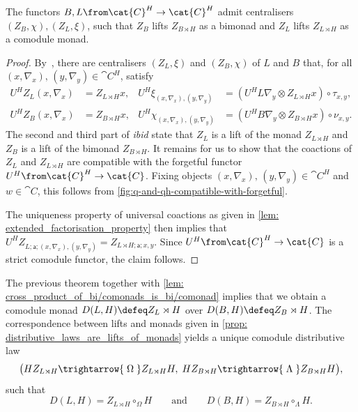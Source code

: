 \begin{theorem}\label{thm: centralisablity_of_lifts}
  The functors \(B, L\from \cat{C}^H\to \cat{C}^H\) admit centralisers \((Z_B, \chi), (Z_L, \xi)\),
  such that \(Z_B\) lifts \(Z_{B \rtimes H}\) as a bimonad
  and \(Z_L\) lifts \(Z_{L \rtimes H}\) as a comodule monad.
\end{theorem}
\begin{proof}
  By~\cite[Theorem~7.4(a)]{Bruguieres2012},
  there are centralisers \((Z_L, \xi)\) and \((Z_B, \chi)\) of \(L\) and \(B\)
  that, for all \((x, \nabla_x),\, (y, \nabla_y) \in \cat{C}^H\), satisfy
  \begin{align*}
    U^H Z_L (x, \nabla_x) &= Z_{L \rtimes H}x, & U^H\xi_{(x, \nabla_x), (y, \nabla_y)} &= (U^H L\nabla_y \otimes Z_{L \rtimes H}x) \circ \tau_{x,y}, \\
    U^H Z_B (x, \nabla_x) &= Z_{B \rtimes H}x, & U^H\chi_{(x, \nabla_x), (y, \nabla_y)} &= (U^H B\nabla_y \otimes Z_{B \rtimes H}x) \circ \nu_{x,y}.
  \end{align*}
  The second and third part of \emph{ibid} state that \(Z_L\) is a lift of the monad \(Z_{L \rtimes H}\) and \(Z_B\) is a lift of the bimonad \(Z_{B \rtimes H}\).
  It remains for us to show that the coactions of \(Z_L\) and \(Z_{L \rtimes H}\) are compatible with the forgetful functor \(U^H \from \cat{C}^H \to \cat{C}\).
  Fixing objects \((x, \nabla_x),\, (y, \nabla_y) \in \cat{C}^H\) and \(w \in \cat{C}\),
  this follows from \cref{fig:q-and-qh-compatible-with-forgetful}.
  \begin{figure}[htbp]
    \centering
    \vspace{-0.3cm}%
  \end{figure}

  The uniqueness property of universal coactions as given in
  \cref{lem: extended_factorisation_property}
  then implies that \(U^H Z_{L;\mathsf{a};(x, \nabla_x), (y, \nabla_y)} = Z_{L \rtimes H;\mathsf{a};x,y}\).
  Since \(U^{H}\from \cat{C}^H \to \cat{C}\) is a strict comodule functor, the claim follows.
\end{proof}

\begin{remark}\label{blackstar}
  The previous theorem together with \cref{lem: cross_product_of_bi/comonads_is_bi/comonad}
  implies that we obtain a comodule monad \(D(L,H) \defeq Z_L \rtimes H\) over \(D(B, H) \defeq Z_B \rtimes H\).
  The correspondence between lifts and monads given in
  \cref{prop: distributive_laws_are_lifts_of_monads} yields a unique comodule distributive law
  \[
    \big(
    H Z_{L \rtimes H}  \trightarrow{\;\Omega\;} Z_{L \rtimes H} H
    ,\;
    H Z_{B \rtimes H} \trightarrow{\;\Lambda\;} Z_{B \rtimes H} H
    \big),
  \]
  such that
  \[
    D(L, H) = Z_{L \rtimes H} \circ_{\Omega} H
    \qquad \text{and} \qquad
    D(B, H) = Z_{B \rtimes H} \circ_{\Lambda} H.
  \]
\end{remark}


